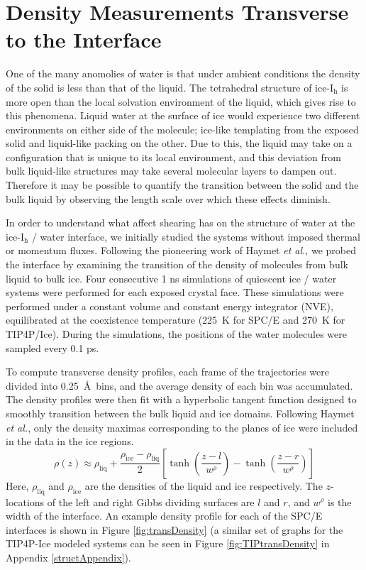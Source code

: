 \section{Density Measurements Transverse to the Interface}
One of the many anomolies of water is that under ambient conditions
the density of the solid is less than that of the liquid. The
tetrahedral structure of ice-I$_\mathrm{h}$ is more open than the
local solvation environment of the liquid, which gives rise to this
phenomena. Liquid water at the surface of ice would experience two
different environments on either side of the molecule; ice-like
templating from the exposed solid and liquid-like packing on the
other. Due to this, the liquid may take on a configuration that is
unique to its local environment, and this deviation from bulk
liquid-like structures may take several molecular layers to dampen
out. Therefore it may be possible to quantify the transition between
the solid and the bulk liquid by observing the length scale over which
these effects diminish.

In order to understand what affect shearing has on the structure of
water at the ice-I$_\mathrm{h}$ / water interface, we initially
studied the systems without imposed thermal or momentum
fluxes. Following the pioneering work of Haymet \textit{et al.}, we
probed the interface by examining the transition of the density of
molecules from bulk liquid to bulk
ice.\cite{Karim1987,Karim1990,Hayward2001,Bryk2004} Four consecutive 1
ns simulations of quiescent ice / water systems were performed for
each exposed crystal face. These simulations were performed under a
constant volume and constant energy integrator (NVE), equilibrated at
the coexistence temperature (225~K for SPC/E and 270~K for
TIP4P/Ice). During the simulations, the positions of the water
molecules were sampled every 0.1 ps.

To compute transverse density profiles, each frame of the trajectories
were divided into 0.25~\AA~bins, and the average density of each bin
was accumulated. The density profiles were then fit with a hyperbolic
tangent function designed to smoothly transition between the bulk
liquid and ice domains. Following Haymet \textit{et al.}, only the
density maximas corresponding to the planes of ice were included in
the data in the ice regions.
\begin{equation}\label{rho_fit}
\rho (z) \approx
\rho_\mathrm{liq}+\frac{\rho_\mathrm{ice}-\rho_\mathrm{liq}}{2}\left[\tanh\left(\frac{z-l}{w^\rho}\right)-\tanh\left(\frac{z-r}{w^\rho}\right)\right]
\end{equation}
Here, $\rho_\mathrm{liq}$ and $\rho_\mathrm{ice}$ are the densities of
the liquid and ice respectively. The $z$-locations of the left and
right Gibbs dividing surfaces are $l$ and $r$, and $w^\rho$ is the
width of the interface. An example density profile for each of the
SPC/E interfaces is shown in Figure \ref{fig:transDensity} (a similar
set of graphs for the TIP4P-Ice modeled systems can be seen in Figure
\ref{fig:TIPtransDensity} in Appendix \ref{structAppendix}).

